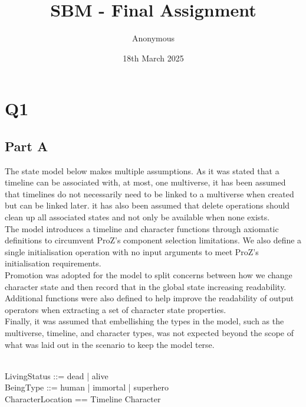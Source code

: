 \documentclass{article}
\title{SBM - Final Assignment}
\date{18th March 2025}
\author{Anonymous}
\begin{document}
\maketitle

\pagebreak 

\section*{Q1}

\subsection*{Part A}

The state model below makes multiple assumptions. As it was stated that a timeline can be associated with, at most, one multiverse, it has been assumed that timelines do not necessarily need to be linked to a multiverse when created but can be linked later. it has also been assumed that delete operations should clean up all associated states and not only be available when none exists. \\
\newline
The model introduces a timeline and character functions through axiomatic definitions to circumvent ProZ's component selection limitations. We also define a single initialisation operation with no input arguments to meet ProZ's initialisation requirements. \\ 
\newline
Promotion was adopted for the model to split concerns between how we change character state and then record that in the global state increasing readability. Additional functions were also defined to help improve the readability of output operators when extracting a set of character state properties. \\
\newline
Finally, it was assumed that embellishing the types in the model, such as the multiverse, timeline, and character types, was not expected beyond the scope of what was laid out in the scenario to keep the model terse.

\begin{zed}
 \\
LivingStatus ::= dead | alive \\
BeingType ::= human | immortal | superhero \\
CharacterLocation == Timeline \cross Character \\
\end{zed}
\end{document}
